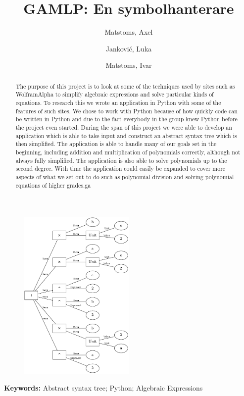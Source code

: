 \documentclass[12pt,a4paper]{article}
\author{
  Matstoms, Axel
  \and
  Jankovi\'{c}, Luka
  \and
  Matstoms, Ivar
}
\title{GAMLP: En symbolhanterare}
\begin{document}
\maketitle
\begin{figure}[h]
  \centering
  \includegraphics[width=0.5\textwidth]{image27}
\end{figure}
\newpage
{}
\begin{abstract}
The purpose of this project is to look at some of the techniques used by sites such as WolframAlpha to simplify algebraic expressions and solve particular kinds of equations. To research this we wrote an application in Python with some of the features of such sites.  We chose to work with Python because of how quickly code can be written in Python and due to the fact everybody in the group knew Python before the project even started. During the span of this project we were able to develop an application which is able to take input and construct an abstract syntax tree which is then simplified. The application is able to handle many of our goals set in the beginning, including addition and multiplication of polynomials correctly, although not always fully simplified. The application is also able to solve polynomials up to the second degree. With time the application could easily be expanded to cover more aspects of what we set out to do such as polynomial division and solving polynomial equations of higher grades.ga
\end{abstract}
\textbf{Keywords:} Abstract syntax tree; Python; Algebraic Expressions
\end{document}
